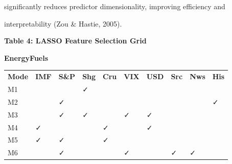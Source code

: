 significantly reduces predictor dimensionality, improving efficiency and

interpretability (Zou \& Hastie, 2005).



\textbf{Table 4: LASSO Feature Selection Grid}



\textbf{EnergyFuels}



{\def\LTcaptype{none} %

\begin{longtable}[]{@{}

  >{\raggedright\arraybackslash}p{}

  >{\raggedright\arraybackslash}p{}

  >{\raggedright\arraybackslash}p{}

  >{\raggedright\arraybackslash}p{}

  >{\raggedright\arraybackslash}p{}

  >{\raggedright\arraybackslash}p{}

  >{\raggedright\arraybackslash}p{}

  >{\raggedright\arraybackslash}p{}

  >{\raggedright\arraybackslash}p{}

  >{\raggedright\arraybackslash}p{}@{}}

\toprule\noalign{}

\endhead

\bottomrule\noalign{}

\endlastfoot

\textbf{Mode} & \textbf{IMF} & \textbf{S\&P} & \textbf{Shg} &

\textbf{Cru} & \textbf{VIX} & \textbf{USD} & \textbf{Src} & \textbf{Nws}

& \textbf{His} \\

M1 & & & ✓ & & & & & & \\

M2 & & ✓ & & & & & & & ✓ \\

M3 & & ✓ & ✓ & & ✓ & ✓ & & & \\

M4 & ✓ & & & ✓ & & ✓ & & & \\

M5 & ✓ & ✓ & & ✓ & & & & & \\

M6 & & ✓ & & & ✓ & & ✓ & ✓ & \\

\end{longtable}

}



